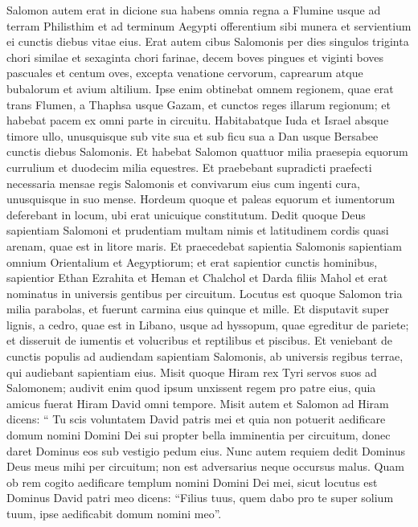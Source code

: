 \begin{biblechapter}
\begin{biblechapter}
\begin{biblechapter}
\begin{biblechapter}
\begin{biblechapter}
\verse Salomon autem erat in dicione sua habens omnia regna a Flumine usque ad terram Philisthim et ad terminum Aegypti offerentium sibi munera et servientium ei cunctis diebus vitae eius. 
\verse Erat autem cibus Salomonis per dies singulos triginta chori similae et sexaginta chori farinae, 
\verse decem boves pingues et viginti boves pascuales et centum oves, excepta venatione cervorum, caprearum atque bubalorum et avium altilium. 
\verse Ipse enim obtinebat omnem regionem, quae erat trans Flumen, a Thaphsa usque Gazam, et cunctos reges illarum regionum; et habebat pacem ex omni parte in circuitu. 
\verse Habitabatque Iuda et Israel absque timore ullo, unusquisque sub vite sua et sub ficu sua a Dan usque Bersabee cunctis diebus Salomonis. 
\verse Et habebat Salomon quattuor milia praesepia equorum currulium et duodecim milia equestres. 
\verse Et praebebant supradicti praefecti necessaria mensae regis Salomonis et convivarum eius cum ingenti cura, unusquisque in suo mense. 
\verse Hordeum quoque et paleas equorum et iumentorum deferebant in locum, ubi erat unicuique constitutum.
 \verse Dedit quoque Deus sapientiam Salomoni et prudentiam multam nimis et latitudinem cordis quasi arenam, quae est in litore maris. 
\verse Et praecedebat sapientia Salomonis sapientiam omnium Orientalium et Aegyptiorum; 
\verse et erat sapientior cunctis hominibus, sapientior Ethan Ezrahita et Heman et Chalchol et Darda filiis Mahol et erat nominatus in universis gentibus per circuitum. 
\verse Locutus est quoque Salomon tria milia parabolas, et fuerunt carmina eius quinque et mille. 
\verse Et disputavit super lignis, a cedro, quae est in Libano, usque ad hyssopum, quae egreditur de pariete; et disseruit de iumentis et volucribus et reptilibus et piscibus. 
\verse Et veniebant de cunctis populis ad audiendam sapientiam Salomonis, ab universis regibus terrae, qui audiebant sapientiam eius.
 \verse Misit quoque Hiram rex Tyri servos suos ad Salomonem; audivit enim quod ipsum unxissent regem pro patre eius, quia amicus fuerat Hiram David omni tempore. 
 \verse Misit autem et Salomon ad Hiram dicens: 
\verse “ Tu scis voluntatem David patris mei et quia non potuerit aedificare domum nomini Domini Dei sui propter bella imminentia per circuitum, donec daret Dominus eos sub vestigio pedum eius. 
 \verse Nunc autem requiem dedit Dominus Deus meus mihi per circuitum; non est adversarius neque occursus malus. 
\verse Quam ob rem cogito aedificare templum nomini Domini Dei mei, sicut locutus est Dominus David patri meo dicens: “Filius tuus, quem dabo pro te super solium tuum, ipse aedificabit domum nomini meo”. 

\end{biblechapter}
\end{biblechapter}
\end{biblechapter}
\end{biblechapter}
\end{biblechapter}
